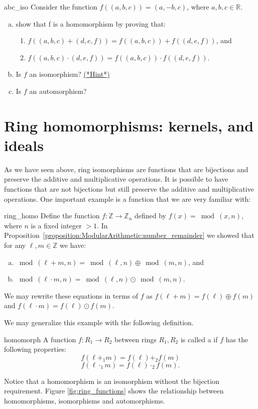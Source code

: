 \begin{exercise}{abc_iso}
Consider the function $f((a,b,c))=(a,-b,c)$, where $a,b,c\in{\mathbb R}$.
\begin{enumerate}[(a)]
\item show that f is a homomorphism by proving that:
\begin{enumerate}[(1)]
\item $f((a,b,c)+(d,e,f))=f((a,b,c))+f((d,e,f))$, and 
\item $f((a,b,c)\cdot(d,e,f))=f((a,b,c))\cdot f((d,e,f))$.
\end{enumerate}
\item Is $f$ an isomorphism? \hyperref[sec:Rings:Hints]{(*Hint*)} 
\item Is $f$ an automorphism?
\end{enumerate}
\end{exercise}

\section{Ring homomorphisms: kernels, and ideals}
\label{sec:Rings:RingHomomorphismKernelsIdeals}

As we have seen above, ring isomorphisms are functions that are bijections and preserve the additive and multiplicative operations. It is possible to have functions that are not bijections but still preserve the additive and multiplicative operations.  One important example is a function that we are very familiar with: 

\begin{example}{ring_homo}
Define the function $f:{\mathbb Z}\rightarrow {\mathbb Z}_n$ defined by $f(x)=\bmod(x,n)$, where $n$ is a fixed integer $> 1$.  In Proposition~\ref{proposition:ModularArithmetic:number_remainder} we showed that for any $\ell,m \in {\mathbb Z}$ we have:
\begin{enumerate}[(a)]
\item
$\bmod(\ell+ m,n) = \bmod(\ell,n) \oplus \bmod(m,n)$, 
and
\item
$\bmod(\ell \cdot m,n) = \bmod(\ell,n) \odot \bmod(m,n)$.
\end{enumerate}
We may rewrite these equations in terms of $f$ as $f(\ell+ m) = f(\ell) \oplus f(m)$ and $f(\ell\cdot m) = f(\ell) \odot f(m)$. 
\end{example}
We may generalize this example with the following definition.

\begin{defn}{homomorph}
A function $f:R_1\rightarrow R_2$ between rings $R_1,R_2$ is called a  if $f$ has the following properties:
\begin{equation}\label{eq:homo_add}
f(\ell+_1 m) = f(\ell) +_2 f(m)
\end{equation} 
\begin{equation}\label{eq:homo_mult}
f(\ell\cdot_1 m) = f(\ell) \cdot_2 f(m).
\end{equation}
\end{defn}
Notice that a homomorphism is an isomorphism without the bijection requirement.  Figure \ref{fig:ring_functions} shows the relationship between homomorphisms, isomorphisms and automorphisms.

